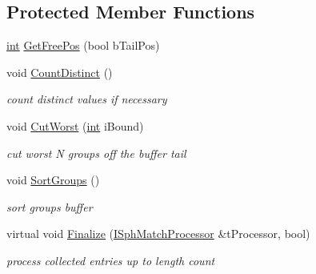 \subsection*{Protected Member Functions}
\begin{DoxyCompactItemize}
\item 
\hyperlink{sphinxexpr_8cpp_a4a26e8f9cb8b736e0c4cbf4d16de985e}{int} \hyperlink{classCSphKBufferNGroupSorter_ab834b88b401815945bac6ae67f4a89cd}{Get\-Free\-Pos} (bool b\-Tail\-Pos)
\item 
void \hyperlink{classCSphKBufferNGroupSorter_a9cfc991b03ce24042a4a87b5cc187dc7}{Count\-Distinct} ()
\begin{DoxyCompactList}\small\item\em count distinct values if necessary \end{DoxyCompactList}\item 
void \hyperlink{classCSphKBufferNGroupSorter_a20ffbf5dd8d3cc1dc8a98b20f483faf2}{Cut\-Worst} (\hyperlink{sphinxexpr_8cpp_a4a26e8f9cb8b736e0c4cbf4d16de985e}{int} i\-Bound)
\begin{DoxyCompactList}\small\item\em cut worst N groups off the buffer tail \end{DoxyCompactList}\item 
void \hyperlink{classCSphKBufferNGroupSorter_afc19d1dc2e796c58def2b5ab16d0b1e4}{Sort\-Groups} ()
\begin{DoxyCompactList}\small\item\em sort groups buffer \end{DoxyCompactList}\item 
virtual void \hyperlink{classCSphKBufferNGroupSorter_ae4b244dcab9fcca38e3b51a8e595fc75}{Finalize} (\hyperlink{structISphMatchProcessor}{I\-Sph\-Match\-Processor} \&t\-Processor, bool)
\begin{DoxyCompactList}\small\item\em process collected entries up to length count \end{DoxyCompactList}\end{DoxyCompactItemize}
